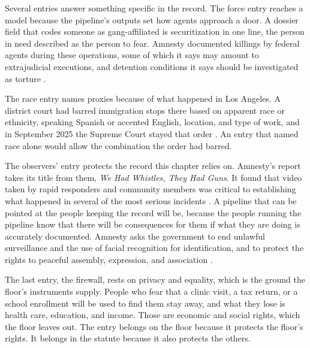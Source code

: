 Several entries answer something specific in the record. The force entry reaches a model because the pipeline's outputs set how agents approach a door. A dossier field that codes someone as gang-affiliated is securitization in one line, the person in need described as the person to fear. Amnesty documented killings by federal agents during these operations, some of which it says may amount to extrajudicial executions, and detention conditions it says should be investigated as torture \autocite{Amnesty2026Whistles}.

The race entry names proxies because of what happened in Los Angeles. A district court had barred immigration stops there based on apparent race or ethnicity, speaking Spanish or accented English, location, and type of work, and in September 2025 the Supreme Court stayed that order \autocite{vasquezperdomo2025}. An entry that named race alone would allow the combination the order had barred.

The observers' entry protects the record this chapter relies on. Amnesty's report takes its title from them, \emph{We Had Whistles, They Had Guns}. It found that video taken by rapid responders and community members was critical to establishing what happened in several of the most serious incidents \autocite{Amnesty2026Whistles}. A pipeline that can be pointed at the people keeping the record will be, because the people running the pipeline know that there will be consequences for them if what they are doing is accurately documented. Amnesty asks the government to end unlawful surveillance and the use of facial recognition for identification, and to protect the rights to peaceful assembly, expression, and association \autocite{Amnesty2026Whistles}.

The last entry, the firewall, rests on privacy and equality, which is the ground the floor's instruments supply. People who fear that a clinic visit, a tax return, or a school enrollment will be used to find them stay away, and what they lose is health care, education, and income. Those are economic and social rights, which the floor leaves out. The entry belongs on the floor because it protects the floor's rights. It belongs in the statute because it also protects the others.
